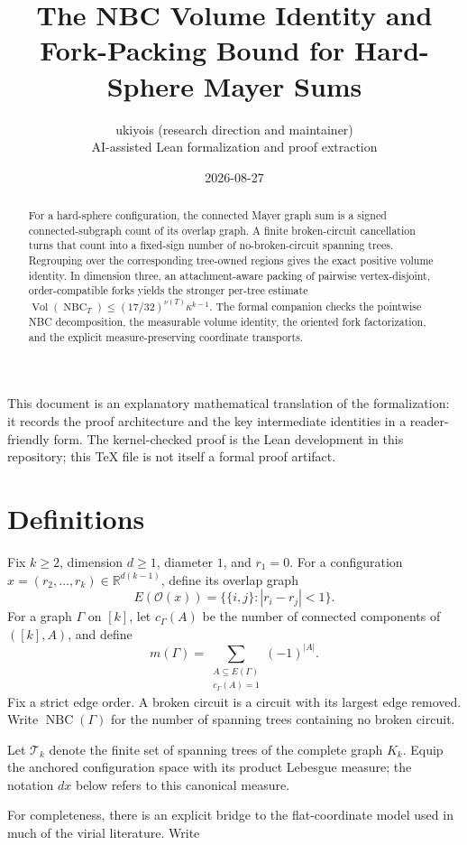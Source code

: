 \documentclass[11pt]{article}
\title{The NBC Volume Identity and Fork-Packing Bound for Hard-Sphere Mayer Sums}
\author{ukiyois (research direction and maintainer)\\
AI-assisted Lean formalization and proof extraction}
\date{2026-08-27}
\newcommand{\NBC}{\operatorname{NBC}}
\newcommand{\Vol}{\operatorname{Vol}}
\newcommand{\calT}{\mathcal{T}}
\newcommand{\calO}{\mathcal{O}}
\newcommand{\1}{\mathbf{1}}
\begin{document}
\maketitle

\begin{abstract}
For a hard-sphere configuration, the connected Mayer graph sum is a signed
connected-subgraph count of its overlap graph.  A finite broken-circuit
cancellation turns that count into a fixed-sign number of no-broken-circuit
spanning trees.  Regrouping over the corresponding tree-owned regions gives
the exact positive volume identity.  In dimension three, an attachment-aware
packing of pairwise vertex-disjoint, order-compatible forks yields the stronger
per-tree estimate
$\Vol(\NBC_T)\le(17/32)^{\nu(T)}\kappa^{k-1}$.
The formal companion checks the pointwise NBC decomposition, the measurable
volume identity, the oriented fork factorization, and the explicit
measure-preserving coordinate transports.
\end{abstract}

This document is an explanatory mathematical translation of the formalization:
it records the proof architecture and the key intermediate identities in a
reader-friendly form.  The kernel-checked proof is the Lean development in
this repository; this TeX file is not itself a formal proof artifact.

\section{Definitions}

Fix $k\ge2$, dimension $d\ge1$, diameter $1$, and $r_1=0$.  For a
configuration $x=(r_2,\ldots,r_k)\in\mathbb{R}^{d(k-1)}$, define its overlap
graph
\[
 E(\calO(x))=\{\{i,j\}:|r_i-r_j|<1\}.
\]
For a graph $\Gamma$ on $[k]$, let $c_\Gamma(A)$ be the number of connected
components of $([k],A)$, and define
\[
 m(\Gamma)=\sum_{\substack{A\subseteq E(\Gamma)\\c_\Gamma(A)=1}}
              (-1)^{|A|}.
\]
Fix a strict edge order.  A broken circuit is a circuit with its largest edge
removed.  Write $\NBC(\Gamma)$ for the number of spanning trees containing no
broken circuit.

Let $\calT_k$ denote the finite set of spanning trees of the complete graph
$K_k$.  Equip the anchored configuration space with its product Lebesgue
measure; the notation $dx$ below refers to this canonical measure.

For completeness, there is an explicit bridge to the flat-coordinate model
used in much of the virial literature.  Write
\end{document}
